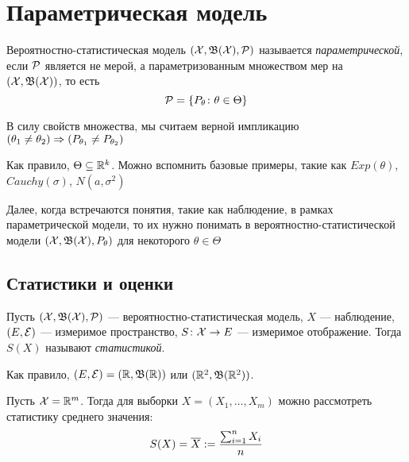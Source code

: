\section{Параметрическая модель}

\begin{definition}
	Вероятностно-статистическая модель $(\mathcal{X}, \mathfrak{B}(\mathcal{X}), \mathcal{P})$ называется \textit{параметрической}, если $\mathcal{P}$ является не мерой, а параметризованным множеством мер на \\ $(\mathcal{X}, \mathfrak{B}(\mathcal{X}))$, то есть
	\[
		\mathcal{P} = \{P_\theta \colon \theta \in \Theta\}
	\]
\end{definition}

\begin{note}
	В силу свойств множества, мы считаем верной импликацию $(\theta_1 \neq \theta_2) \Rightarrow (P_{\theta_1} \neq P_{\theta_2})$
\end{note}

\begin{note}
	Как правило, $\Theta \subseteq \mathbb{R}^k$. Можно вспомнить базовые примеры, такие как $Exp(\theta)$, $Cauchy(\sigma)$, $N(a, \sigma^2)$
\end{note}

\begin{anote}
	Далее, когда встречаются понятия, такие как наблюдение, в рамках параметрической модели, то их нужно понимать в вероятностно-статистической модели $(\mathcal{X}, \mathfrak{B}(\mathcal{X}), P_\theta)$ для некоторого $\theta \in \Theta$
\end{anote}

\subsection{Статистики и оценки}

\begin{definition}
	Пусть $(\mathcal{X}, \mathfrak{B}(\mathcal{X}), \mathcal{P})$ --- вероятностно-статистическая модель, $X$ --- наблюдение, $(E, \mathcal{E})$ --- измеримое пространство, $S \colon \mathcal{X} \to E$ --- измеримое отображение. Тогда $S(X)$ называют \textit{статистикой}.
\end{definition}

\begin{note}
	Как правило, $(E, \mathcal{E}) = (\mathbb{R}, \mathfrak{B}(\mathbb{R}))$ или $(\mathbb{R}^2, \mathfrak{B}(\mathbb{R}^2))$.
\end{note}

\begin{example}
	Пусть $\mathcal{X} = \mathbb{R}^m$. Тогда для выборки $X = (X_1, \ldots, X_m)$ можно рассмотреть статистику среднего значения:
	\[
		S(X) = \overline{X} := \frac{\sum_{i = 1}^n X_i}{n}
	\]
\end{example}\

